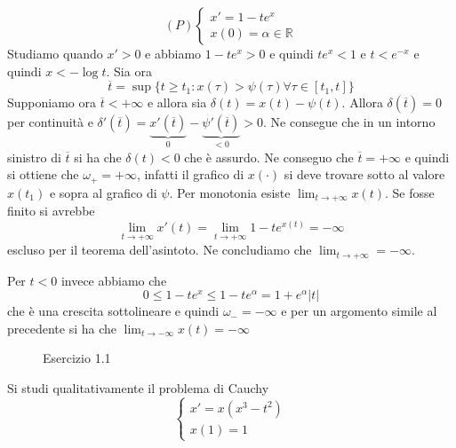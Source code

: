 \begin{eser}
    \[
        (P) \begin{cases}
            x' = 1-te^{x} \\
            x(0) = \alpha \in \mathbb{R}
        \end{cases}
    \]
     Studiamo quando \(x' > 0\) e abbiamo \(1 - te^{x}> 0\) e quindi \(te^{x}<1\)
     e \(t < e^{-x}\) e quindi \(x < -\log t\).
     Sia ora 
     \[
         \overline{t} = \sup \{t \ge t_{1} : x(\tau) > \psi {(\tau)} \forall \tau
         \in [t_{1}, t]\} 
     \]
    Supponiamo ora \(\overline{t} < +\infty\) e allora sia \(\delta(t) =
    x{(t)}-\psi {(t)}\). Allora \(\delta {(\overline{t})}=0\) per continuità e
    \(\delta'{(\overline{t})} = \underbrace{x'{(\overline{t})}}_{0}  -
    \underbrace{\psi'{(\overline{t})}}_{<0} > 0\). Ne consegue che in un intorno
    sinistro di \(\overline{t}\) si ha che \(\delta(t) < 0\) che è assurdo. Ne
    conseguo che \(\overline{t} = +\infty\) e quindi si ottiene che \(\omega_+ =
    +\infty\), infatti il grafico di \(x{(\cdot )}\) si deve trovare sotto al
    valore \(x{(t_{1})}\) e sopra al grafico di \(\psi\). Per monotonia esiste
    \(\lim_{t\to +\infty} x{(t)}\). Se fosse finito si avrebbe
    \[
        \lim_{t\to +\infty} x'{(t)} = \lim_{t \to +\infty} 1 - te^{x{(t)}} =
        -\infty
    \]
    escluso per il teorema dell'asintoto. Ne concludiamo che \(\lim_{t\to
    +\infty} = -\infty\).

    Per \(t < 0\) invece abbiamo che
    \[
        0 \le 1-te^{x} \le 1 - t e^{\alpha} = 1 + e^{\alpha} |t|
    \]
    che è una crescita sottolineare e quindi \(\omega_- = -\infty\) e per un
    argomento simile al precedente si ha che \(\lim_{t \to -\infty} x{(t)} =
    -\infty\)
\end{eser}
\begin{figure}[ht]
    \centering
    \caption{Esercizio 1.1}\label{fig:eser1}
\end{figure}
\begin{eser}
    Si studi qualitativamente il problema di Cauchy
    \[
        \begin{cases}
            x' = x{(x^3-t^2)} \\
            x{(1)}=1
        \end{cases}
   \]
\end{eser}
